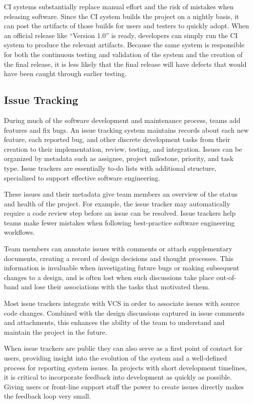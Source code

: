 CI systems substantially replace manual effort and the risk of
mistakes when releasing software. Since the CI system builds the
project on a nightly basis, it can post the artifacts of those builds
for users and testers to quickly adopt. When an official release like
``Version 1.0'' is ready, developers can simply run the CI system to
produce the relevant artifacts. Because the same system is responsible
for both the continuous testing and validation of the system and the
creation of the final release, it is less likely that the final
release will have defects that would have been caught through earlier
testing.

\subsection{Issue Tracking}

During much of the software development and maintenance process, teams
add features and fix bugs. An issue tracking system maintains records
about each new feature, each reported bug, and other discrete
development tasks from their creation to their implementation, review,
testing, and integration. Issues can be organized by metadata such as
assignee, project milestone, priority, and task type. Issue trackers
are essentially to-do lists with additional structure, specialized to
support effective software engineering.

These issues and their metadata give team members an overview of the
status and health of the project. For example, the issue tracker may
automatically require a code review step before an issue can be
resolved. Issue trackers help teams make fewer mistakes when following
best-practice software engineering workflows.

Team members can annotate issues with comments or attach supplementary
documents, creating a record of design decisions and thought
processes. This information is invaluable when investigating future
bugs or making subsequent changes to a design, and is often lost when
such discussions take place out-of-band and lose their associations
with the tasks that motivated them.

Most issue trackers integrate with VCS in order to associate issues
with source code changes. Combined with the design discussions
captured in issue comments and attachments, this enhances the ability
of the team to understand and maintain the project in the future.

When issue trackers are public they can also serve as a first point of
contact for users, providing insight into the evolution of the system
and a well-defined process for reporting system issues. In projects
with short development timelines, it is critical to incorporate
feedback into development as quickly as possible. Giving users or
front-line support staff the power to create issues directly makes the
feedback loop very small.

